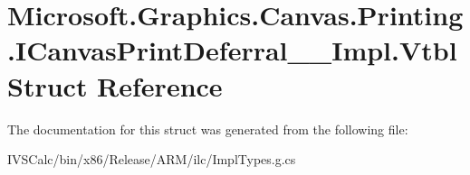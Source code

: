 \hypertarget{struct_microsoft_1_1_graphics_1_1_canvas_1_1_printing_1_1_i_canvas_print_deferral_____impl_1_1_vtbl}{}\section{Microsoft.\+Graphics.\+Canvas.\+Printing.\+I\+Canvas\+Print\+Deferral\+\_\+\+\_\+\+Impl.\+Vtbl Struct Reference}
\label{struct_microsoft_1_1_graphics_1_1_canvas_1_1_printing_1_1_i_canvas_print_deferral_____impl_1_1_vtbl}


The documentation for this struct was generated from the following file\+:\begin{DoxyCompactItemize}
\item 
I\+V\+S\+Calc/bin/x86/\+Release/\+A\+R\+M/ilc/Impl\+Types.\+g.\+cs\end{DoxyCompactItemize}
